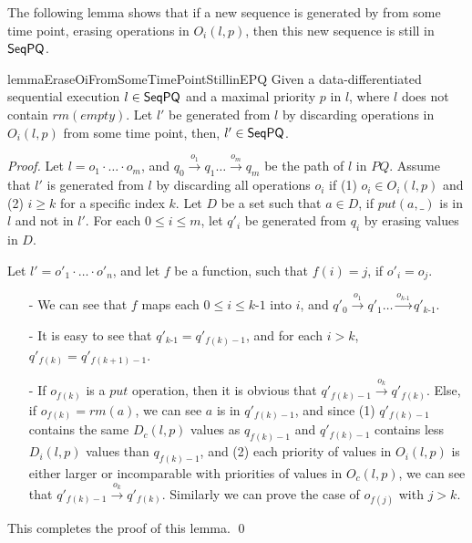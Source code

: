 The following lemma shows that if a new sequence is generated by from some time point, erasing operations in $O_i(l,p)$, then this new sequence is still in $\mathsf{SeqPQ}$.

\begin{restatable}{lemma}{EraseOiFromSomeTimePointStillinEPQ}
\label{lemma:erase Oi from some time point still in EPQ}
Given a data-differentiated sequential execution $l \in \mathsf{SeqPQ}$ and a maximal priority $p$ in $l$, where $l$ does not contain $\textit{rm}(\textit{empty})$. Let $l'$ be generated from $l$ by discarding operations in $O_i(l,p)$ from some time point, then, $l' \in \mathsf{SeqPQ}$.
\end{restatable}

\begin {proof}
Let $l=o_1 \cdot \ldots \cdot o_m$, and $q_0 \xrightarrow{o_1} q_1 \ldots \xrightarrow{o_m} q_m$ be the path of $l$ in $\textit{PQ}$. Assume that $l'$ is generated from $l$ by discarding all operations $o_i$ if (1) $o_i \in O_i(l,p)$ and (2) $i \geq k$ for a specific index $k$. Let $D$ be a set such that $a \in D$, if $\textit{put}(a,\_)$ is in $l$ and not in $l'$. For each $0 \leq i \leq m$, let $q'_i$ be generated from $q_i$ by erasing values in $D$.

Let $l'=o'_1 \cdot \ldots \cdot o'_n$, and let $f$ be a function, such that $f(i)=j$, if $o'_i = o_j$.

\begin{itemize}
\setlength{\itemsep}{0.5pt}
\item[-] We can see that $f$ maps each $0 \leq i \leq \textit{k-1}$ into $i$, and $q'_0 \xrightarrow{o_1} q'_1 \ldots \xrightarrow{o_{\textit{k-1}}} q'_{\textit{k-1}}$.

\item[-] It is easy to see that $q'_{\textit{k-1}} = q'_{f(k)-1}$, and for each $i>k$, $q'_{f(k)} = q'_{f(k+1)-1}$.

\item[-] If $o_{f(k)}$ is a $\textit{put}$ operation, then it is obvious that $q'_{f(k)-1} \xrightarrow{o_k} q'_{f(k)}$. Else, if $o_{f(k)} = \textit{rm}(a)$, we can see $a$ is in $q'_{f(k)-1}$, and since (1) $q'_{f(k)-1}$ contains the same $D_c(l,p)$ values as $q_{f(k)-1}$ and $q'_{f(k)-1}$ contains less $D_i(l,p)$ values than $q_{f(k)-1}$, and (2) each priority of values in $O_i(l,p)$ is either larger or incomparable with priorities of values in  $O_c(l,p)$, we can see that $q'_{f(k)-1} \xrightarrow{o_k} q'_{f(k)}$. Similarly we can prove the case of $o_{f(j)}$ with $j > k$.
\end{itemize}

This completes the proof of this lemma. \qed
\end {proof}

